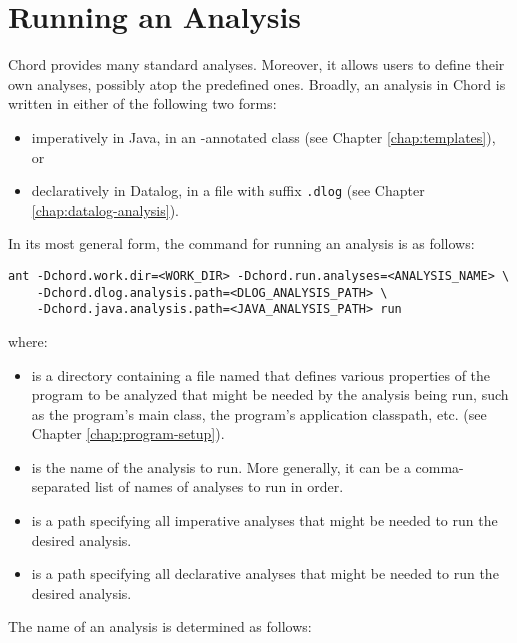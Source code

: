 \chapter{Running an Analysis}
\label{chap:running-analysis}

Chord provides many standard analyses.  Moreover, it allows users to define their
own analyses, possibly atop the predefined ones.
Broadly, an analysis in Chord is written in either of the following two forms:

\begin{itemize}
\item
imperatively in Java, in an -annotated class (see Chapter \ref{chap:templates}), or
\item
declaratively in Datalog, in a file with suffix {\tt .dlog} (see Chapter \ref{chap:datalog-analysis}).
\end{itemize}

In its most general form, the command for running an analysis is as follows:

\begin{framed}
\begin{verbatim}
ant -Dchord.work.dir=<WORK_DIR> -Dchord.run.analyses=<ANALYSIS_NAME> \
    -Dchord.dlog.analysis.path=<DLOG_ANALYSIS_PATH> \
    -Dchord.java.analysis.path=<JAVA_ANALYSIS_PATH> run
\end{verbatim}
\end{framed}

where:
\begin{itemize}
\item
{} is a directory
containing a file named  that defines various properties
of the program to be analyzed that might be needed by the analysis being run,
such as the program's main class, the program's application classpath, etc.  (see
Chapter \ref{chap:program-setup}).
\item
{} is the name of the analysis to run.  More generally, it
can be a comma-separated list of names of analyses to run in order.
\item
\code{<JAVA_ANALYSIS_PATH>} is a path specifying all imperative analyses that might
be needed to run the desired analysis.
\item
{} is a path specifying all declarative analyses that
might be needed to run the desired analysis.
\end{itemize}

The name of an analysis is determined as follows:

